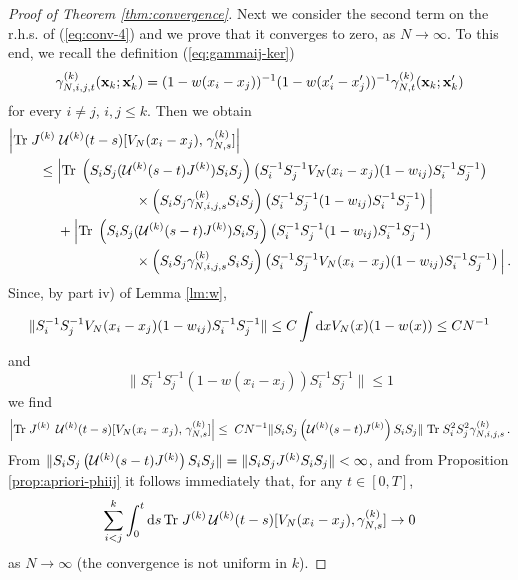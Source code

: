 \documentclass[11pt]{article}
\newcommand{\rd}{{\rm d}}
\newcommand{\bx}{{\bf x}}
\newcommand{\cU}{{\cal U}}
\newcommand{\tr}{\mbox{Tr}}
\begin{document}
\begin{proof}[Proof of Theorem \ref{thm:convergence}]
Next we consider the second term on the r.h.s. of (\ref{eq:conv-4})
and we prove that it converges to zero, as $N \to \infty$. To this
end, we recall the definition (\ref{eq:gammaij-ker}) \[
\gamma_{N,i,j,t}^{(k)} (\bx_k;\bx'_k) = (1-w(x_i -x_j))^{-1}
(1-w(x'_i -x'_j))^{-1}  \gamma_{N,t}^{(k)} (\bx_k;\bx'_k)\] for
every $i\neq j$, $i,j \leq k$. Then we obtain
\begin{equation}\label{eq:long}
\begin{split}
\left| \tr \; J^{(k)} \right. & \, \cU^{(k)} (t-s) [ V_N (x_i
-x_j),\left. \gamma_{N,s}^{(k)} ] \right| \\ \leq \; & \Big| \tr \;
\left(S_i S_j (\cU^{(k)} (s-t) J^{(k)}) S_i S_j \right) \left(
S_i^{-1} S_j^{-1} V_N (x_i -x_j) (1-w_{ij}) S_i^{-1} S_j^{-1}\right)
\\ &\hspace{2cm} \times \left(S_i S_j  \gamma^{(k)}_{N,i,j,s} S_i S_j
\right) \left(S_i^{-1} S_j^{-1} (1-w_{ij}) S_i^{-1} S_j^{-1}\right)\Big| \\
&+  \Big| \tr \; \left(S_i S_j (\cU^{(k)} (s-t) J^{(k)}) S_i
S_j\right)  \left(S_i^{-1} S_j^{-1} (1-w_{ij}) S_i^{-1}
S_j^{-1}\right)
\\ &\hspace{2cm} \times \left(S_i S_j  \gamma^{(k)}_{N,i,j,s} S_i S_j
\right) \left( S_i^{-1} S_j^{-1} V_N (x_i -x_j) (1-w_{ij}) S_i^{-1}
S_j^{-1}\right) \Big| \,.
\end{split}
\end{equation}
Since, by part iv) of Lemma \ref{lm:w},
\begin{equation}\label{eq:conv-4-2b}
\| S_i^{-1} S_j^{-1} V_N (x_i -x_j) (1-w_{ij}) S_i^{-1}
S_j^{-1} \| \leq C \int \rd x V_N (x) (1-w(x)) \leq C N^{-1}
\end{equation}
and
\begin{equation}
\| S_i^{-1} S_j^{-1} (1-w(x_i -x_j)) S_i^{-1} S_j^{-1} \| \leq 1
\end{equation}
we find
\begin{equation*}
\left| \tr \; J^{(k)} \right. \, \cU^{(k)} (t-s) [ V_N (x_i
-x_j),\left. \gamma_{N,s}^{(k)} ] \right| \leq \;   C N^{-1} \| S_i
S_j \left( \cU^{(k)} (s-t) J^{(k)} \right) S_i S_j \| \; \tr \;
S_i^2 S_j^2  \gamma_{N,i,j,s}^{(k)}\,.
\end{equation*}
{F}rom $\|S_i S_j \left( \cU^{(k)} (s-t) J^{(k)} \right) S_i S_j \|
= \| S_i S_j J^{(k)} S_i S_j \| <\infty$, and from Proposition
\ref{prop:apriori-phiij} it follows immediately that, for any $t \in
[0,T]$,
\begin{equation}\label{eq:conv-5a}
\sum_{i<j}^k \int_0^t  \rd s \, \tr \; J^{(k)} \, \cU^{(k)} (t-s) [
V_N (x_i -x_j), \gamma_{N,s}^{(k)} ] \to 0
\end{equation}
as $N \to \infty$ (the convergence is not uniform in $k$).



\end{proof}
\end{document}
